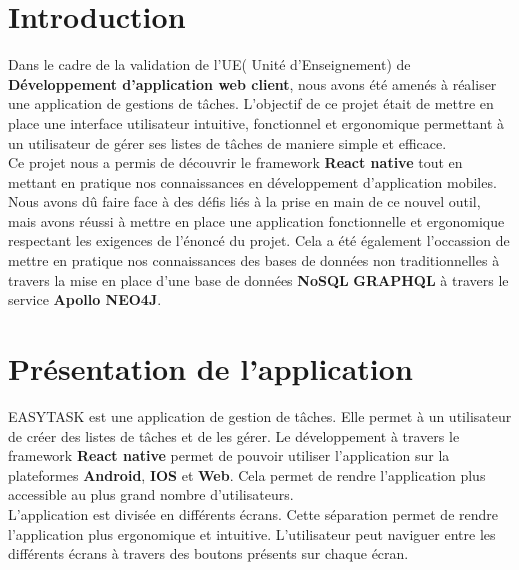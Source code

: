 \documentclass[12pt]{article}
\begin{document}
    \section{Introduction}{\label{sec:intro}}

        Dans le cadre de la validation de l'UE( Unité d'Enseignement) de \textbf{Développement d'application web client},
        nous avons été amenés à réaliser une application de gestions de tâches. L'objectif de ce projet était de mettre
        en place une interface utilisateur intuitive, fonctionnel et ergonomique permettant à un utilisateur de gérer
        ses listes de tâches de maniere simple et efficace.\\

        Ce projet nous a permis de découvrir le framework \textbf{React native } tout en mettant en pratique nos
        connaissances en développement d'application mobiles. Nous avons dû faire face à des défis liés à la prise
        en main de ce nouvel outil, mais avons réussi à mettre en place une application fonctionnelle et ergonomique
        respectant les exigences de l'énoncé du projet. Cela a été également l'occassion de mettre en pratique nos
        connaissances des bases de données non traditionnelles à travers la mise en place d'une base de données
        \textbf{NoSQL} \textbf{GRAPHQL} à travers le service \textbf{Apollo NEO4J}.

        \section{Présentation de l'application}{\label{sec:app}}
        EASYTASK est une application de gestion de tâches. Elle permet à un utilisateur de créer des listes de tâches
        et de les gérer. Le développement à travers le framework \textbf{React native} permet de pouvoir utiliser
        l'application sur la plateformes \textbf{Android}, \textbf{IOS} et \textbf{Web}. Cela permet de rendre l'application
        plus accessible au plus grand nombre d'utilisateurs.\\
        L'application est divisée en différents écrans. Cette séparation permet de rendre l'application plus
        ergonomique et intuitive. L'utilisateur peut naviguer entre les différents écrans à travers des boutons
        présents sur chaque écran.\\
\end{document}
